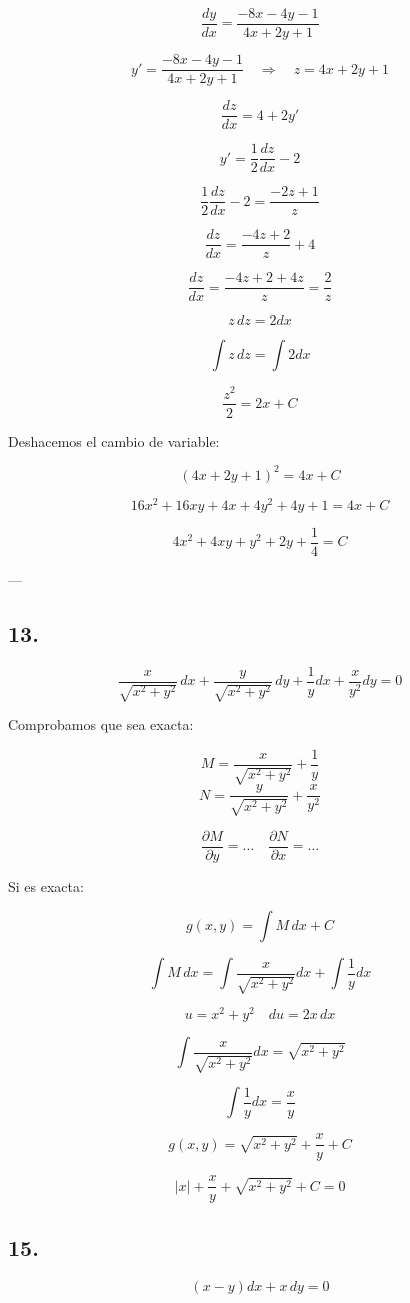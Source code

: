 \documentclass[a4paper,12pt]{article}
\begin{document}
\[
\frac{dy}{dx} = \frac{-8x - 4y - 1}{4x + 2y + 1}
\]

\[
y' = \frac{-8x - 4y - 1}{4x + 2y + 1} \quad \Rightarrow \quad z = 4x + 2y + 1
\]

\[
\frac{dz}{dx} = 4 + 2y'
\]

\[
y' = \frac{1}{2} \frac{dz}{dx} - 2
\]

\[
\frac{1}{2}\frac{dz}{dx} - 2 = \frac{-2z + 1}{z}
\]

\[
\frac{dz}{dx} = \frac{-4z + 2}{z} + 4
\]

\[
\frac{dz}{dx} = \frac{-4z + 2 + 4z}{z} = \frac{2}{z}
\]

\[
z\, dz = 2 dx
\]

\[
\int z\, dz = \int 2 dx
\]

\[
\frac{z^2}{2} = 2x + C
\]

Deshacemos el cambio de variable:

\[
(4x + 2y + 1)^2 = 4x + C
\]

\[
16x^2 + 16xy + 4x + 4y^2 + 4y + 1 = 4x + C
\]

\[
4x^2 + 4xy + y^2 + 2y + \frac{1}{4} = C
\]

---

\subsection*{13.}
\[
\frac{x}{\sqrt{x^2 + y^2}}\, dx + \frac{y}{\sqrt{x^2 + y^2}}\, dy + \frac{1}{y} dx + \frac{x}{y^2} dy = 0
\]

Comprobamos que sea exacta:

\[
M = \frac{x}{\sqrt{x^2 + y^2}} + \frac{1}{y}
\]
\[
N = \frac{y}{\sqrt{x^2 + y^2}} + \frac{x}{y^2}
\]

\[
\frac{\partial M}{\partial y} = \dots \quad \frac{\partial N}{\partial x} = \dots
\]

Si es exacta:

\[
g(x,y) = \int M\, dx + C
\]

\[
\int M\, dx = \int \frac{x}{\sqrt{x^2 + y^2}} dx + \int \frac{1}{y} dx
\]

\[
u = x^2 + y^2 \quad du = 2x\, dx
\]

\[
\int \frac{x}{\sqrt{x^2 + y^2}} dx = \sqrt{x^2 + y^2}
\]

\[
\int \frac{1}{y} dx = \frac{x}{y}
\]

\[
g(x,y) = \sqrt{x^2 + y^2} + \frac{x}{y} + C
\]

\[
|x| + \frac{x}{y} + \sqrt{x^2 + y^2} + C = 0
\]
\subsection*{15.}
\[
(x - y)dx + x\, dy = 0
\]
\end{document}

